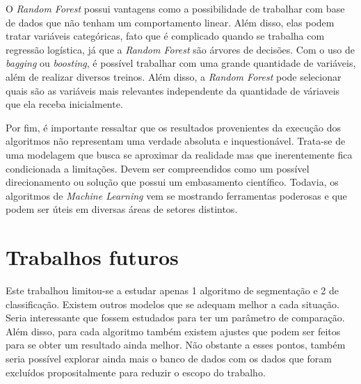 O \emph{Random Forest} possui vantagens como a possibilidade de trabalhar com base de dados que não tenham um comportamento linear. Além disso, elas podem tratar variáveis categóricas, fato que é complicado quando se trabalha com regressão logística, já que a \emph{Random Forest} são árvores de decisões. Com o uso de \emph{bagging} ou \emph{boosting}, é possível trabalhar com uma grande quantidade de variáveis, além de realizar diversos treinos. Além disso, a \emph{Random Forest} pode selecionar quais são as variáveis mais relevantes independente da quantidade de váriaveis que ela receba inicialmente.

Por fim, é importante ressaltar que os resultados provenientes da execução dos algoritmos não representam uma verdade absoluta e inquestionável. Trata-se de uma modelagem que busca se aproximar da realidade mas que inerentemente fica condicionada a limitações. Devem ser compreendidos como um possível direcionamento ou solução que possui um embasamento científico. Todavia, os algoritmos de \emph{Machine Learning} vem se mostrando ferramentas poderosas e que podem ser úteis em diversas áreas de setores distintos.

\section{Trabalhos futuros}
Este trabalhou limitou-se a estudar apenas 1 algoritmo de segmentação e 2 de classificação. Existem outros modelos que se adequam melhor a cada situação. Seria interessante que fossem estudados para ter um parâmetro de comparação.
Além disso, para cada algoritmo também existem ajustes que podem ser feitos para se obter um resultado ainda melhor.
Não obstante a esses pontos, também seria possível explorar ainda mais o banco de dados com os dados que foram excluídos propositalmente para reduzir o escopo do trabalho.



